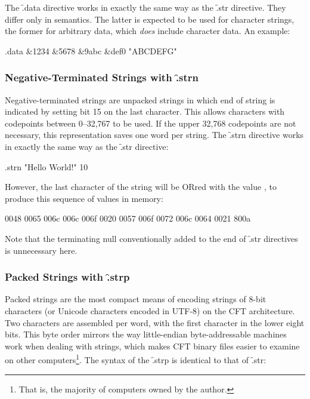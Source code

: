 The \f{.data} directive works in exactly the same way as the \f{.str}
directive. They differ only in semantics. The latter is expected to be used for
character strings, the former for arbitrary data, which {\em does\/} include
character data. An example:

\begin{cftasmcode}
.data &1234 &5678 &9abc &def0 "ABCDEFG"
\end{cftasmcode}

\subsubsection{Negative-Terminated Strings with \f{.strn}}

Negative-terminated strings are unpacked strings in which end of string is
indicated by setting bit 15 on the last character. This allows characters with
codepoints between 0–32,767 to be used. If the upper 32,768 codepoints are not
necessary, this representation saves one word per string. The \f{.strn}
directive works in exactly the same way as the \f{.str} directive:

\begin{cftasmcode}
.strn "Hello World!" 10
\end{cftasmcode}

However, the last character of the string will be ORred with the value
, to produce this sequence of values in memory:

\begin{intrcode}
0048 0065 006c 006c 006f 0020 0057 006f
0072 006c 0064 0021 800a
\end{intrcode}

Note that the terminating null conventionally added to the end of \f{.str}
directives is unnecessary here.



\subsubsection{Packed Strings with \f{.strp}}
\label{sec:asm-pstring}

Packed strings are the most compact means of encoding strings of 8-bit
characters (or Unicode characters encoded in UTF-8) on the CFT
architecture. Two characters are assembled per word, with the first character
in the lower eight bits. This byte order mirrors the way little-endian
byte-addressable machines work when dealing with strings, which makes CFT
binary files easier to examine on other computers\footnote{That is, the
  majority of computers owned by the author.}. The syntax of the \f{.strp} is
identical to that of \f{.str}:

